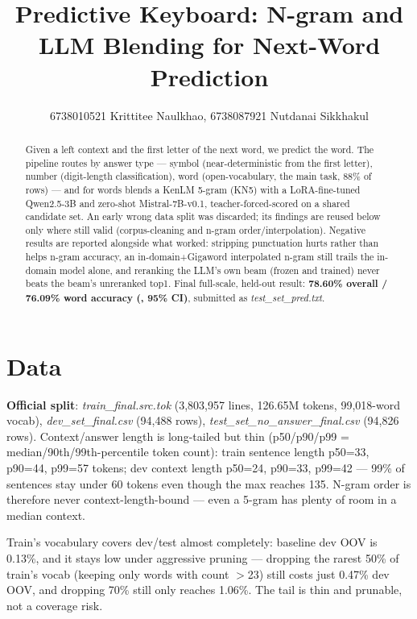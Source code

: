 \documentclass[11pt,conference]{IEEEtran}
\newcommand{\code}[1]{\textit{#1}}
\begin{document}
\title{Predictive Keyboard: N-gram and LLM Blending for Next-Word Prediction}
\author{6738010521 Krittitee Naulkhao, 6738087921 Nutdanai Sikkhakul}
\maketitle

\begin{abstract}
Given a left context and the first letter of the next word, we predict the
word. The pipeline routes by answer type --- symbol (near-deterministic from
the first letter), number (digit-length classification), word
(open-vocabulary, the main task, 88\% of rows) --- and for words blends a
KenLM 5-gram (KN5) with a LoRA-fine-tuned Qwen2.5-3B and zero-shot
Mistral-7B-v0.1, teacher-forced-scored on a shared candidate set. An early
wrong data split was discarded; its findings are reused below only where
still valid (corpus-cleaning and n-gram order/interpolation). Negative
results are reported alongside what worked: stripping punctuation hurts
rather than helps n-gram accuracy, an in-domain+Gigaword interpolated n-gram
still trails the in-domain model alone, and reranking the LLM's own beam
(frozen and trained) never beats the beam's unreranked top1. Final
full-scale, held-out result: \textbf{78.60\% overall / 76.09\% word accuracy
(, 95\% CI)}, submitted as \code{test\_set\_pred.txt}.
\end{abstract}

\section{Data}
\label{sec:data}

\textbf{Official split}: \code{train\_final.src.tok} (3,803,957 lines, 126.65M
tokens, 99,018-word vocab), \code{dev\_set\_final.csv} (94,488 rows),
\code{test\_set\_no\_answer\_final.csv} (94,826 rows). Context/answer length
is long-tailed but thin (p50/p90/p99 = median/90th/99th-percentile token
count): train sentence length p50=33, p90=44, p99=57 tokens; dev context
length p50=24, p90=33, p99=42 --- 99\% of sentences stay under 60 tokens even
though the max reaches 135. N-gram order is therefore never
context-length-bound --- even a 5-gram has plenty of room in a median context.

Train's vocabulary covers dev/test almost completely: baseline dev OOV is
0.13\%, and it stays low under aggressive pruning --- dropping the rarest 50\%
of train's vocab (keeping only words with count $>$23) still costs just 0.47\%
dev OOV, and dropping 70\% still only reaches 1.06\%. The tail is thin and
prunable, not a coverage risk.
\end{document}
